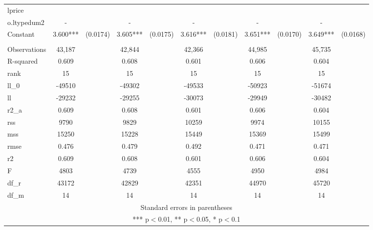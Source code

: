 \documentclass[]{article}
\begin{document}
\begin{tabular}{lcccccccccc}
lprice &  &  &  &  &  &  &  &  &  &  \\
o.ltypedum2 & - &  & - &  & - &  & - &  & - &  \\
Constant & 3.600*** & (0.0174) & 3.605*** & (0.0175) & 3.616*** & (0.0181) & 3.651*** & (0.0170) & 3.649*** & (0.0168) \\
 &  &  &  &  &  &  &  &  &  &  \\
Observations & 43,187 &  & 42,844 &  & 42,366 &  & 44,985 &  & 45,735 &  \\
R-squared & 0.609 &  & 0.608 &  & 0.601 &  & 0.606 &  & 0.604 &  \\
rank & 15 &  & 15 &  & 15 &  & 15 &  & 15 &  \\
ll\_0 & -49510 &  & -49302 &  & -49533 &  & -50923 &  & -51674 &  \\
ll & -29232 &  & -29255 &  & -30073 &  & -29949 &  & -30482 &  \\
r2\_a & 0.609 &  & 0.608 &  & 0.601 &  & 0.606 &  & 0.604 &  \\
rss & 9790 &  & 9829 &  & 10259 &  & 9974 &  & 10155 &  \\
mss & 15250 &  & 15228 &  & 15449 &  & 15369 &  & 15499 &  \\
rmse & 0.476 &  & 0.479 &  & 0.492 &  & 0.471 &  & 0.471 &  \\
r2 & 0.609 &  & 0.608 &  & 0.601 &  & 0.606 &  & 0.604 &  \\
F & 4803 &  & 4739 &  & 4555 &  & 4950 &  & 4984 &  \\
df\_r & 43172 &  & 42829 &  & 42351 &  & 44970 &  & 45720 &  \\
 df\_m & 14 &  & 14 &  & 14 &  & 14 &  & 14 &  \\ \hline
\multicolumn{11}{c}{ Standard errors in parentheses} \\
\multicolumn{11}{c}{ *** p$<$0.01, ** p$<$0.05, * p$<$0.1} \\
\end{tabular}
\end{document}
